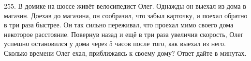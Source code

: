 255. В домике на шоссе живёт велосипедист Олег. Однажды он выехал из дома в магазин. Доехав до магазина, он сообразил, что забыл карточку, и поехал обратно в три раза быстрее. Он так сильно переживал, что проехал мимо своего дома некоторое расстояние. Повернув назад и ещё в три раза увеличив скорость, Олег успешно остановился у дома через 5 часов после того, как выехал из него. Сколько времени Олег ехал, приближаясь к своему дому? Ответ дайте в минутах.\\
